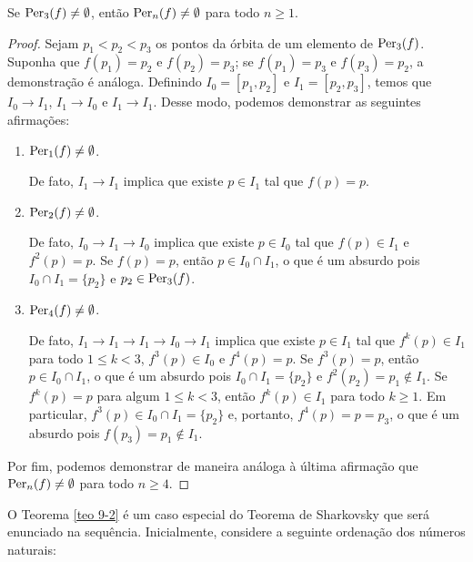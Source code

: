 \begin{theorem}\label{teo 9-2}
Se $\operatorname{Per}_3(f) \neq \emptyset$, então $\operatorname{Per}_n(f) \neq \emptyset$ para todo $n \geq 1$.
\end{theorem}

\begin{proof}
Sejam $p_1 < p_2 < p_3$ os pontos da órbita de um elemento de $\operatorname{Per}_3(f)$. Suponha que $f(p_1) = p_2$ e $f(p_2) = p_3$; se $f(p_1) = p_3$ e $f(p_3) = p_2$, a demonstração é análoga.
Definindo $I_0 = [p_1, p_2]$ e $I_1 = [p_2, p_3]$, temos que $I_0 \longrightarrow I_1$, $I_1 \longrightarrow I_0$ e $I_1 \longrightarrow I_1$. Desse modo, podemos demonstrar as seguintes afirmações:

\begin{enumerate}[label=\alph*)]
\item $\operatorname{Per}_1(f) \neq \emptyset$.

De fato, $I_1 \longrightarrow I_1$ implica que existe $p \in I_1$ tal que $f(p) = p$.

\item $\operatorname{Per}_2(f) \neq \emptyset$.

De fato, $I_0 \longrightarrow I_1 \longrightarrow I_0$ implica que existe $p \in I_0$ tal que $f(p) \in I_1$ e $f^2(p) = p$.
Se $f(p) = p$, então $p \in I_0 \cap I_1$, o que é um absurdo pois $I_0 \cap I_1 = \lbrace p_2 \rbrace$ e $p_2 \in \operatorname{Per}_3(f)$.

\item $\operatorname{Per}_4(f) \neq \emptyset$.

De fato, $I_1 \longrightarrow I_1 \longrightarrow I_1 \longrightarrow I_0 \longrightarrow I_1$ implica que existe $p \in I_1$ tal que $f^k(p) \in I_1$ para todo $1 \leq k < 3$, $f^3(p) \in I_0$ e $f^4(p) = p$.
Se $f^3(p) = p$, então $p \in I_0 \cap I_1$, o que é um absurdo pois $I_0 \cap I_1 = \lbrace p_2 \rbrace$ e $f^2(p_2) = p_1 \notin I_1$.
Se $f^k(p) = p$ para algum $1 \leq k < 3$, então $f^k(p) \in I_1$ para todo $k \geq 1$.
Em particular, $f^3(p) \in I_0 \cap I_1 = \lbrace p_2 \rbrace$ e, portanto, $f^4(p) = p = p_3$, o que é um absurdo pois $f(p_3) = p_1 \notin I_1$.
\end{enumerate}

Por fim, podemos demonstrar de maneira análoga à última afirmação que $\operatorname{Per}_n(f) \neq \emptyset$ para todo $n \geq 4$.
\end{proof}

O Teorema \ref{teo 9-2} é um caso especial do Teorema de Sharkovsky que será enunciado na sequência.
Inicialmente, considere a seguinte ordenação dos números naturais:


